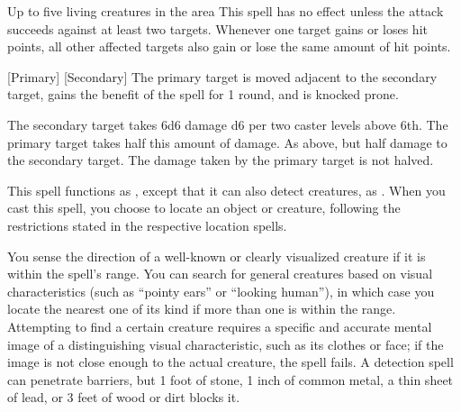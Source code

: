 \spelldur{\durshort}
\begin{spelltargets}{Up to five living creatures in the area}
    \spellspecial This spell has no effect unless the attack succeeds against at least two targets.
    \spellsuccess Whenever one target gains or loses hit points, all other affected targets also gain or lose the same amount of hit points.
\end{spelltargets}

\spellrng{\rngclose}
[Primary]
[Secondary]
\spellline
\spelleffect The primary target is moved adjacent to the secondary target, gains the benefit of the  spell for 1 round, and is knocked prone.
\begin{spellmargin}
    \spellsuccess The secondary target takes 6d6 damage \add d6 per two caster levels above 6th. The primary target takes half this amount of damage.
    \spellfailure As above, but half damage to the secondary target. The damage taken by the primary target is not halved.
\end{spellmargin}

\spellrng{\rngext}
\spelldur{\durlong \dismissable}
\spelleffect This spell functions as , except that it can also detect creatures, as . When you cast this spell, you choose to locate an object or creature, following the restrictions stated in the respective location spells.

\spellrng{\rnglong}
\spelldur{\durmed \dismissable}
\spelleffect You sense the direction of a well-known or clearly visualized creature if it is within the spell's range. You can search for general creatures based on visual characteristics (such as ``pointy ears'' or ``looking human''), in which case you locate the nearest one of its kind if more than one is within the range. Attempting to find a certain creature requires a specific and accurate mental image of a distinguishing visual characteristic, such as its clothes or face; if the image is not close enough to the actual creature, the spell fails.
\spellnotes A detection spell can penetrate barriers, but 1 foot of stone, 1 inch of common metal, a thin sheet of lead, or 3 feet of wood or dirt blocks it.

